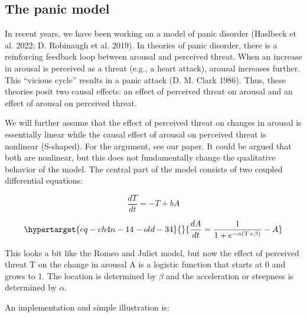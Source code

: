 \documentclass[
  a4paper,
  DIV=11,
  numbers=noendperiod]{scrreprt}
\begin{document}
\hypertarget{sec-The-panic-model}{%
\subsection{The panic model}\label{sec-The-panic-model}}

In recent years, we have been working on a model of panic disorder
(Haslbeck et al. 2022; D. Robinaugh et al. 2019). In theories of panic
disorder, there is a reinforcing feedback loop between arousal and
perceived threat. When an increase in arousal is perceived as a threat
(e.g., a heart attack), arousal increases further. This ``vicious
cycle'' results in a panic attack (D. M. Clark 1986). Thus, these
theories posit two causal effects: an effect of perceived threat on
arousal and an effect of arousal on perceived threat.

We will further assume that the effect of perceived threat on changes in
arousal is essentially linear while the causal effect of arousal on
perceived threat is nonlinear (S-shaped). For the argument, see our
paper. It could be argued that both are nonlinear, but this does not
fundamentally change the qualitative behavior of the model. The central
part of the model consists of two coupled differential equations:

\[\frac{dT}{dt} = - T + bA\]

\begin{equation}\protect\hypertarget{eq-ch4n-14-old-34}{}{
\frac{dA}{dt} = \frac{1}{1 + e^{- \alpha(T + \beta)}} - A
}\label{eq-ch4n-14-old-34}\end{equation}

This looks a bit like the Romeo and Juliet model, but now the effect of
perceived threat T on the change in arousal A is a logistic function
that starts at 0 and grows to 1. The location is determined by \(\beta\)
and the acceleration or steepness is determined by \(\alpha\).

An implementation and simple illustration is:
\end{document}

